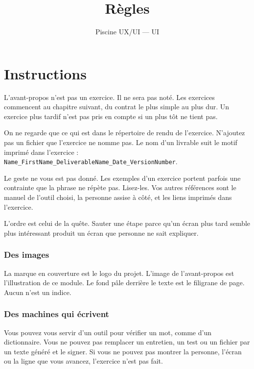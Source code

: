 \documentclass{training}
\begin{document}
\title{Règles}
\subtitle{Piscine UX/UI --- UI}
\maketitle

\newpage
\tableofcontents
\newpage


\chapter{Instructions}

L'avant-propos n'est pas un exercice. Il ne sera pas noté. Les exercices commencent au chapitre suivant, du contrat le plus simple au plus dur. Un exercice plus tardif n'est pas pris en compte si un plus tôt ne tient pas.

On ne regarde que ce qui est dans le répertoire de rendu de l'exercice. N'ajoutez pas un fichier que l'exercice ne nomme pas. Le nom d'un livrable suit le motif imprimé dans l'exercice : \texttt{Name\_FirstName\_DeliverableName\_Date\_VersionNumber}.

Le geste ne vous est pas donné. Les exemples d'un exercice portent parfois une contrainte que la phrase ne répète pas. Lisez-les. Vos autres références sont le manuel de l'outil choisi, la personne assise à côté, et les liens imprimés dans l'exercice.

L'ordre est celui de la quête. Sauter une étape parce qu'un écran plus tard semble plus intéressant produit un écran que personne ne sait expliquer.

\subsection*{Des images}

La marque en couverture est le logo du projet. L'image de l'avant-propos est l'illustration de ce module. Le fond pâle derrière le texte est le filigrane de page. Aucun n'est un indice.

\subsection*{Des machines qui écrivent}

Vous pouvez vous servir d'un outil pour vérifier un mot, comme d'un dictionnaire. Vous ne pouvez pas remplacer un entretien, un test ou un fichier par un texte généré et le signer. Si vous ne pouvez pas montrer la personne, l'écran ou la ligne que vous avancez, l'exercice n'est pas fait.
\end{document}
